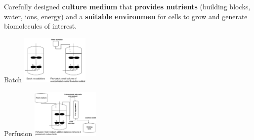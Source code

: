 Carefully designed \textbf{culture medium} that
\textbf{provides nutrients} (building blocks,
water, ions, energy) and a \textbf{suitable
environmen} for cells to grow and
generate biomolecules of interest.\\

\begin{minipage}{0.45\linewidth}
    Batch
    \includegraphics[width=33mm]{src/Images/batch.png}
\end{minipage}
\begin{minipage}{0.45\linewidth}
    Perfusion
    \includegraphics[width=33mm]{src/Images/perfusion.png}
\end{minipage}